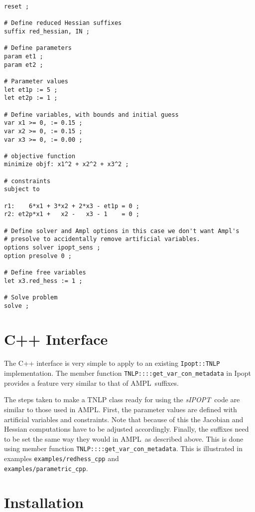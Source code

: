 \documentclass[letter, 11pt]{article}
\newcommand{\sensKKT}{\emph{sIPOPT}}
\newcommand{\AMPL}{AMPL}
\begin{document}
\begin{lstlisting}[language=ampl, caption={\AMPL\ code for Problem \ref{eq:exr}.}, label={ampl:exrh}, frame=single, captionpos=b]
reset ;

# Define reduced Hessian suffixes
suffix red_hessian, IN ;

# Define parameters
param et1 ;
param et2 ;

# Parameter values
let et1p := 5 ;
let et2p := 1 ;

# Define variables, with bounds and initial guess
var x1 >= 0, := 0.15 ;
var x2 >= 0, := 0.15 ;
var x3 >= 0, := 0.00 ;

# objective function
minimize objf: x1^2 + x2^2 + x3^2 ;

# constraints
subject to

r1:    6*x1 + 3*x2 + 2*x3 - et1p = 0 ;
r2: et2p*x1 +   x2 -   x3 - 1    = 0 ;

# Define solver and Ampl options in this case we don't want Ampl's
# presolve to accidentally remove artificial variables.
options solver ipopt_sens ;
option presolve 0 ;

# Define free variables
let x3.red_hess := 1 ;

# Solve problem
solve ;
\end{lstlisting}




\section{C++ Interface}

The C++ interface is very simple to apply to an existing {\tt Ipopt::TNLP} implementation.
The member function {\tt TNLP::::get\_var\_con\_metadata} in Ipopt provides a feature very
similar to that of \AMPL\ suffixes.

The steps taken to make a TNLP class ready for using the \sensKKT\ code are similar to those used in \AMPL.
First, the parameter values are defined with artificial variables and constraints. Note that
because of this the Jacobian and Hessian computations have to be adjusted accordingly. Finally,
the suffixes need to be set the same way they would in \AMPL\ as described above.
This is done using member function {\tt TNLP::::get\_var\_con\_metadata}.
This is illustrated in examples \texttt{examples/redhess\_cpp} and \\
\texttt{examples/parametric\_cpp}.

\section{Installation}
\end{document}
